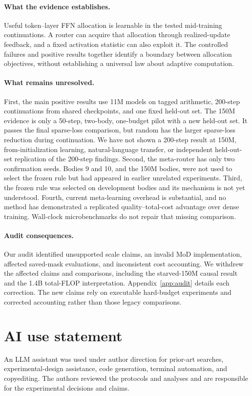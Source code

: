\documentclass{article}
\begin{document}
\paragraph{What the evidence establishes.}
Useful token--layer FFN allocation is learnable in the tested mid-training
continuations. A router can acquire that allocation through realized-update
feedback, and a fixed activation statistic can also exploit it. The controlled
failures and positive results together identify a boundary between allocation
objectives, without establishing a universal law about adaptive computation.

\paragraph{What remains unresolved.}
First, the main positive results use 11M models on tagged arithmetic, 200-step
continuations from shared checkpoints, and one fixed held-out set. The 150M
evidence is only a 50-step, two-body, one-budget pilot with a new held-out set.
It passes the final sparse-loss comparison, but random has the larger
sparse-loss reduction during continuation. We have not shown a 200-step result
at 150M, from-initialization learning, natural-language transfer, or
independent held-out-set replication of the 200-step findings. Second, the
meta-router has only two confirmation seeds. Bodies 9 and 10, and the 150M
bodies, were not used to select the frozen rule but had appeared in earlier
unrelated experiments. Third, the frozen rule was selected on development
bodies and its mechanism is not yet understood. Fourth, current meta-learning
overhead is substantial, and no method has demonstrated a replicated
quality--total-cost advantage over dense training. Wall-clock microbenchmarks
do not repair that missing comparison.

\paragraph{Audit consequences.}
Our audit identified unsupported scale claims, an invalid MoD implementation,
affected saved-mask evaluations, and inconsistent cost accounting. We withdrew
the affected claims and comparisons, including the starved-150M causal result
and the 1.4B total-FLOP interpretation. Appendix~\ref{app:audit} details each
correction. The new claims rely on executable hard-budget experiments and
corrected accounting rather than those legacy comparisons.

\section*{AI use statement}
An LLM assistant was used under author direction for prior-art searches,
experimental-design assistance, code generation, terminal automation, and
copyediting. The authors reviewed the protocols and analyses and are
responsible for the experimental decisions and claims.
\end{document}
